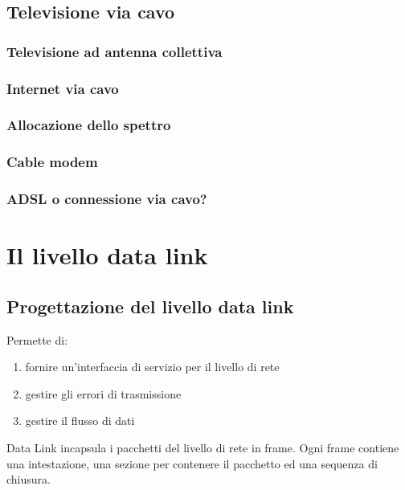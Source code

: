 \documentclass{article}
\begin{document}
	\subsection{Televisione via cavo}
	\subsubsection{Televisione ad antenna collettiva}
	\subsubsection{Internet via cavo}
	\subsubsection{Allocazione dello spettro}
	\subsubsection{Cable modem}
	\subsubsection{ADSL o connessione via cavo?}
	
	
\newpage
	
	
	
\section{Il livello data link}
\subsection{Progettazione del livello data link}
Permette di:
\begin{enumerate}
\item fornire un'interfaccia di servizio per il livello di rete
\item gestire gli errori di trasmissione
\item gestire il flusso di dati
\end{enumerate}
Data Link incapsula i pacchetti del livello di rete in frame. Ogni frame contiene una intestazione, una sezione per contenere il pacchetto ed una sequenza di chiusura. 
\end{document}
